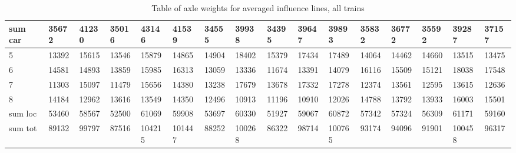 \begin{sidewaystable}
{\begin{tabularx}{\textheight}{ |l|X|X|X|X|X|X|X|X|X|X|X|X|X|X|X| }
      \hline
      sum car & 35672   &   41230   &    35016   &    43146   &    41539    &   34555  &     39938    &   34395   &    39647   &    39893   &    35832   &    36772    &   35592   &   39287    &    37157  \\
      \hline
      5 & 13392   &   15615   &    13546   &    15879   &    14865    &   14904  &     18402    &   15379   &    17434   &    17489   &    14064   &    14462    &   14660   &   13515    &    13475  \\
      \hline
      6 & 14581   &   14893   &    13859   &    15985   &    16313    &   13059  &     13336    &   11674   &    13391   &    14079   &    16116   &    15509    &   15121   &   18038    &    17548  \\
      \hline
      7 & 11303   &   15097   &    11479   &    15656   &    14380    &   13238  &     17679    &   13678   &    17332   &    17278   &    12374   &    13561    &   12595   &   13615    &    12636  \\
      \hline
      8 & 14184   &   12962   &    13616   &    13549   &    14350    &   12496  &     10913    &   11196   &    10910   &    12026   &    14788   &    13792    &   13933   &   16003    &    15501  \\
      \hline
      sum loc & 53460   &   58567   &    52500   &    61069   &    59908    &   53697  &     60330    &   51927   &    59067   &    60872   &    57342   &    57324    &   56309   &   61171    &    59160  \\
      \bottomrule
      sum tot & 89132 & 99797 & 87516 & 104215 & 101447 & 88252 & 100268 & 86322 & 98714 & 100765 & 93174 & 94096 & 91901 & 100458 & 96317  \\
      \bottomrule
    \end{tabularx}}
	\caption{Table of axle weights for averaged influence lines, all trains}
	\label{table:all_trains_all sensors}
\end{sidewaystable}

